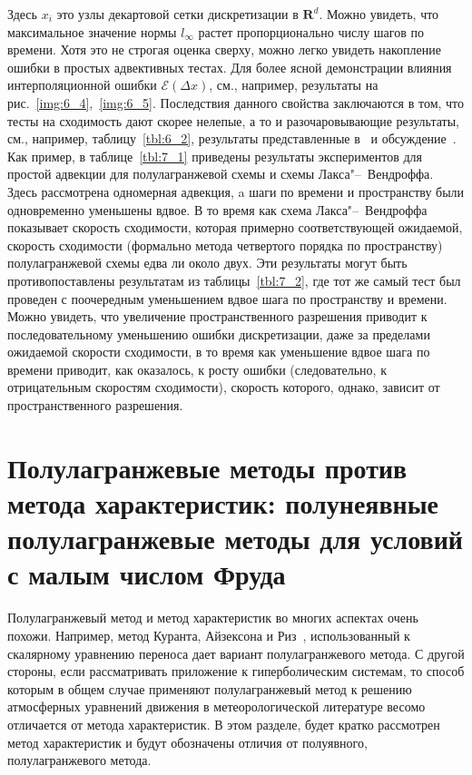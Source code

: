 %
Здесь $x_i$ это узлы декартовой сетки дискретизации в $\mathbf{R}^d$. Можно увидеть, что максимальное значение нормы $l_{\infty}$ растет пропорционально числу шагов по времени. Хотя это не строгая оценка сверху, можно легко увидеть накопление ошибки в простых адвективных тестах. Для более ясной демонстрации влияния интерполяционной ошибки $\mathcal{E}(\Delta x)$, см., например, результаты на рис.~\ref{img:6_4},~\ref{img:6_5}. Последствия данного свойства заключаются в том, что тесты на сходимость дают скорее нелепые, а то и разочаровывающие результаты, см., например, таблицу~\ref{tbl:6_2}, результаты представленные в~\cite{A16} и обсуждение~\cite{A26}. Как пример, в таблице~\ref{tbl:7_1} приведены результаты экспериментов для простой адвекции для полулагранжевой схемы и схемы Лакса"--~Вендроффа. Здесь рассмотрена одномерная адвекция, a шаги по времени и пространству были одновременно уменьшены вдвое. В то время как схема Лакса"--~Вендроффа показывает скорость сходимости, которая примерно соответствующей ожидаемой, скорость сходимости (формально метода четвертого порядка по пространству) полулагранжевой схемы едва ли около двух. Эти результаты могут быть противопоставлены результатам из таблицы~\ref{tbl:7_2}, где тот же самый тест был проведен с поочередным уменьшением вдвое шага по пространству и времени. Можно увидеть, что увеличение пространственного разрешения приводит к последовательному уменьшению ошибки дискретизации, даже за пределами ожидаемой скорости сходимости, в то время как уменьшение вдвое шага по времени приводит, как оказалось, к росту ошибки (следовательно, к отрицательным скоростям сходимости), скорость которого, однако, зависит от пространственного разрешения.
\chapter{Полулагранжевые методы против метода характеристик: полунеявные полулагранжевые методы для условий с малым числом Фруда} \label{chapt_8}
Полулагранжевый метод и метод характеристик во многих аспектах очень похожи.
Например, метод  Куранта, Айзексона и Риз~\cite{A11}, использованный к скалярному уравнению переноса дает вариант полулагранжевого метода. С другой стороны, если рассматривать приложение к гиперболическим системам, то способ которым в общем случае применяют полулагранжевый метод к решению атмосферных уравнений движения в метеорологической литературе весомо отличается от метода характеристик. В этом разделе, будет кратко рассмотрен метод характеристик и будут обозначены отличия от полуявного, полулагранжевого метода.

